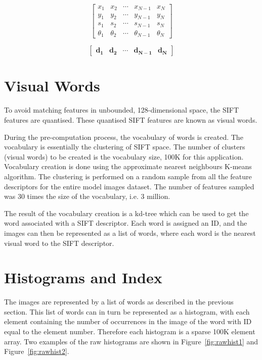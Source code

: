 \documentclass[11pt, onecolumn, a4paper, final]{report} %
\begin{document}
\begin{equation}
\left[ \begin{array}{ccccc}
x_1 & x_2 & \cdots & x_{N-1} & x_N \\
y_1 & y_2 & \cdots & y_{N-1} & y_N \\
s_1 & s_2 & \cdots & s_{N-1} & s_N \\
\theta_1 & \theta_2 & \cdots & \theta_{N-1} & \theta_N
\end{array}\right]
\label{eqn:frames}
\end{equation}

\begin{equation}
\left[ \begin{array}{ccccc}
\mathbf{d_1} & \mathbf{d_2} & \cdots & \mathbf{d_{N-1}} & \mathbf{d_N} 
\end{array}\right]
\label{eqn:descrs}
\end{equation}

\section{Visual Words}
\label{sec:visualwords}
To avoid matching features in unbounded, 128-dimensional space, the SIFT features are quantised. These quantised SIFT features are known as visual words.

During the pre-computation process, the vocabulary of words is created. The vocabulary is essentially the clustering of SIFT space. The number of clusters (visual words) to be created is the vocabulary size, 100K for this application. Vocabulary creation is done using the approximate nearest neighbours K-means algorithm. The clustering is performed on a random sample from all the feature descriptors for the entire model images dataset. The number of features sampled was 30 times the size of the vocabulary, i.e. 3 million. 

The result of the vocabulary creation is a kd-tree which can be used to get the word associated with a SIFT descriptor. Each word is assigned an ID, and the images can then be represented as a list of words, where each word is the nearest visual word to the SIFT descriptor.

\section{Histograms and Index}
\label{sec:histograms}
The images are represented by a list of words as described in the previous section. This list of words can in turn be represented as a histogram, with each element containing the number of occurrences in the image of the word with ID equal to the element number. Therefore each histogram is a sparse 100K element array. Two examples of the raw histograms are shown in Figure~\ref{fig:rawhist1} and Figure~\ref{fig:rawhist2}.
\end{document}
